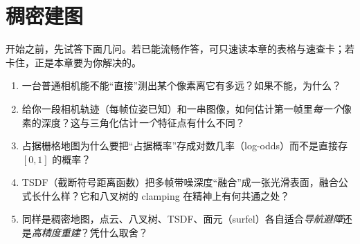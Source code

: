 \chapter{稠密建图}
\label{ch:dense}


\begin{practice}[前置自测]
开始之前，先试答下面几问。若已能流畅作答，可只速读本章的表格与速查卡；若卡住，正是本章要为你解决的。
\begin{enumerate}
  \item 一台普通相机能不能“直接”测出某个像素离它有多远？如果不能，为什么？
  \item 给你一段相机轨迹（每帧位姿已知）和一串图像，如何估计第一帧里\emph{每一个}像素的深度？这与三角化估计\emph{一个}特征点有什么不同？
  \item 占据栅格地图为什么要把“占据概率”存成对数几率（log-odds）而不是直接存 $[0,1]$ 的概率？
  \item TSDF（截断符号距离函数）把多帧带噪深度“融合”成一张光滑表面，融合公式长什么样？它和八叉树的 clamping 在精神上有何共通之处？
  \item 同样是稠密地图，点云、八叉树、TSDF、面元（surfel）各自适合\emph{导航避障}还是\emph{高精度重建}？凭什么取舍？
\end{enumerate}
\end{practice}

